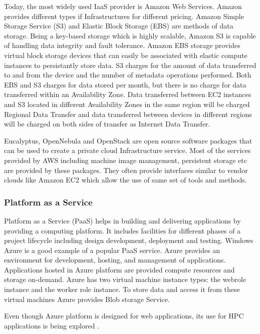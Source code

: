 \documentclass[12pt,a4paper]{report}
\begin{document}
Today, the most widely used IaaS provider is Amazon Web Services. Amazon provides different types if Infrastructures for different pricing. 
Amazon Simple Storage Service (S3) and Elastic Block Storage (EBS) are methods of data storage. 
Being a key-based storage which is highly scalable, Amazon S3 is capable of handling data integrity and fault tolerance. 
Amazon EBS storage provides virtual block storage devices that can easily be associated with elastic compute instances to persistantly store data. 
S3 charges for the amount of data transferred to and from the device and the number of metadata operations performed. 
Both EBS and S3 charges for data stored per month, but there is no charge for data transferred within an Availability Zone\cite{}.
Data transferred between EC2 instances and S3 located in different Availability Zones in the same region will be charged Regional Data Transfer and 
data transferred between devices in different regions will be charged on both sides of transfer as Internet Data Transfer.

Eucalyptus, OpenNebula and OpenStack are open source software packages that can be used to create a private cloud Infrastructure service.
Most of the services provided by AWS including machine image management, persistent storage etc are provided by these packages. 
They often provide interfaces similar to vendor clouds like Amazon EC2 which allow the use of same set of tools and methods. 

\subsubsection{Platform as a Service}

Platform as a Service (PaaS) helps in building and delivering applications by providing a computing platform. 
It includes facilities for different phases of a project lifecycle including design development, deployment and testing.
Windows Azure is a good example of a popular PaaS service. 
Azure provides an environment for development, hosting, and management of applications.
Applications hosted in Azure platform are provided compute resources and storage on-demand.
Azure has two virtual machine instance types: the webrole instance and the worker role instance. 
To store data and access it from these virtual machines Azure provides Blob storage Service.

Even though Azure platform is designed for web applications, its use for HPC applications is being explored \cite{li2010escience}.
\end{document}
